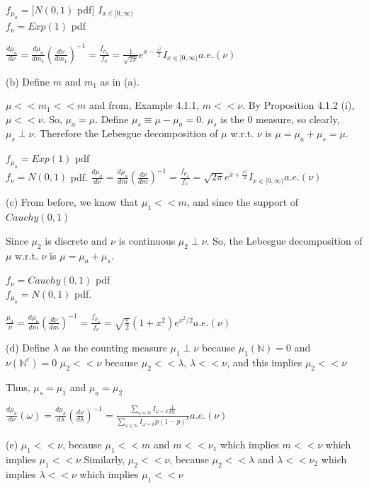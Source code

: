 \documentclass[12pt,letterpaper, onecolumn]{exam}
\newcommand{\nat}{\mathbb{N}}
\begin{document}
\begin{questions}
\begin{solution}
        $f_{\mu_a} = [N(0, 1)$ pdf] $I_{x \in [0, \infty)}$ \\ $f_\nu = Exp(1)$ pdf

        $\frac{d \mu_a}{d\nu} = \frac{d\mu_a}{d m_1} \left(\frac{d\nu}{d m_1}\right)^{-1} = \frac{f_{\mu_a}}{f_\nu} = \frac{1}{\sqrt{2 \pi}} e^{x - \tfrac{x^2}{2}}I_{x \in [0, \infty)}a.e.(\nu)$
        
       (b) Define $m$ and $m_1$ as in (a). 

       $\mu << m_1 << m$ and from, Example 4.1.1, $m << \nu$. By Proposition 4.1.2 (i), $\mu << \nu$. So, $\mu_a = \mu$. Define $\mu_s \equiv \mu - \mu_a = 0$. $\mu_s$ is the 0 measure, so clearly, $\mu_s \perp \nu$. Therefore the Lebesgue decomposition of $\mu$ w.r.t. $\nu$ is $\mu = \mu_a + \mu_s = \mu$. 

       $f_{\mu_a} = Exp(1)$ pdf \\ $f_\nu = N(0,1)$ pdf.
        $\frac{d \mu_a}{d\nu} = \frac{d\mu_a}{d m} \left(\frac{d\nu}{d m}\right)^{-1} = \frac{f_{\mu_a}}{f_\nu} = \sqrt{2 \pi} e^{x + \tfrac{x^2}{2}}I_{x \in [0, \infty)} a.e.(\nu)$

    (c) From before, we know that $\mu_1 << m$, and since the support of $Cauchy(0, 1)$

    Since $\mu_2$ is discrete and $\nu$ is continuous $\mu_2 \perp \nu$. So, the Lebesgue decomposition of $\mu$ w.r.t. $\nu$ is $\mu = \mu_a + \mu_s$. 

    $f_{\nu} = Cauchy(0,1)$ pdf \\ $f_{\mu_a} = N(0,1)$ pdf.
    
    $\frac{\mu_a}{\nu} =  \frac{d\mu_a}{d m} \left(\frac{d\nu}{d m}\right)^{-1} = \frac{f_{\mu_a}}{f_\nu} = \sqrt{\frac{\pi}{2}}(1 + x^2)e^{x^2/2} a.e.(\nu)$

    (d) 
    Define $\lambda$ as the counting measure 
    $\mu_1 \perp \nu$ because $\mu_1(\nat) = 0$ and $\nu(\nat^c) = 0$
    $\mu_2 << \nu$ because $\mu_2 << \lambda$, $\lambda << \nu$, and this implies $\mu_2 << \nu$

    Thus, $\mu_s = \mu_1$ and $\mu_a = \mu_2$

    $\frac{d \mu_a}{d \nu}(\omega) = \frac{d \mu_a}{d\lambda}(\frac{d \nu}{d\lambda})^{-1} = \frac{\sum_{\omega \in \nat} I_{\omega = k}\frac{1}{k! e}}{\sum_{\omega \in \nat} I_{\omega = k} p(1-p)^k}a.e.(\nu)$

    (e) $\mu_1 << \nu$, because $\mu_1 << m$ and $m << \nu_1$ which implies $m << \nu$ which implies $\mu_1 << \nu$
    Similarly, $\mu_2 << \nu$, because $\mu_2 << \lambda$ and $\lambda << \nu_2$ which implies $\lambda << \nu$ which implies $\mu_1 << \nu$


\end{solution}
\end{questions}
\end{document}
